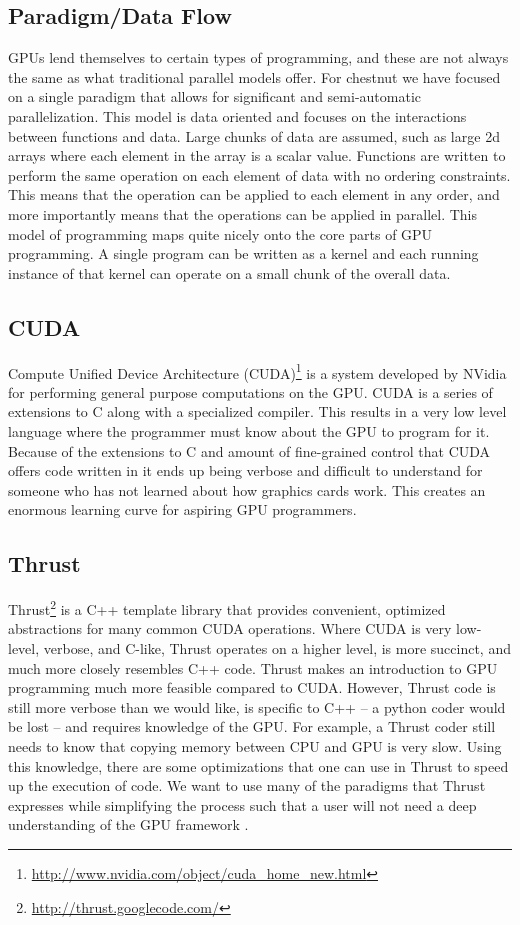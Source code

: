 \documentclass[twocolumn]{article}
\renewcommand{\|}{\origbar} %
\begin{document}
\subsection{Paradigm/Data Flow}

GPUs lend themselves to certain types of programming, and these are not always the same as what traditional parallel models offer. For chestnut we have focused on a single paradigm that allows for significant and semi-automatic parallelization. This model is data oriented and focuses on the interactions between functions and data. Large chunks of data are assumed, such as large 2d arrays where each element in the array is a scalar value. Functions are written to perform the same operation on each element of data with no ordering constraints. This means that the operation can be applied to each element in any order, and more importantly means that the operations can be applied in parallel. This model of programming maps quite nicely onto the core parts of GPU programming. A single program can be written as a kernel and each running instance of that kernel can operate on a small chunk of the overall data.

\subsection{CUDA}
\label{sec:CUDA}

Compute Unified Device Architecture (CUDA)\footnote{\url{http://www.nvidia.com/object/cuda_home_new.html}} is a system developed by NVidia for performing general purpose computations on the GPU. CUDA is a series of extensions to C along with a specialized compiler. This results in a very low level language where the programmer must know about the GPU to program for it. Because of the extensions to C and amount of fine-grained control that CUDA offers code written in it ends up being verbose and difficult to understand for someone who has not learned about how graphics cards work. This creates an enormous learning curve for aspiring GPU programmers.

\subsection{Thrust}

Thrust\footnote{\url{http://thrust.googlecode.com/}} is a C++ template library that provides convenient, optimized abstractions for many common CUDA operations. Where CUDA is very low-level, verbose, and C-like, Thrust operates on a higher level, is more succinct, and much more closely resembles C++ code. Thrust makes an introduction to GPU programming much more feasible compared to CUDA. However, Thrust code is still more verbose than we would like, is specific to C++ -- a python coder would be lost -- and requires knowledge of the GPU. For example, a Thrust coder still needs to know that copying memory between CPU and GPU is very slow. Using this knowledge, there are some optimizations that one can use in Thrust to speed up the execution of code. We want to use many of the paradigms that Thrust expresses while simplifying the process such that a user will not need a deep understanding of the GPU framework \cite{hoberock}.
\end{document}

